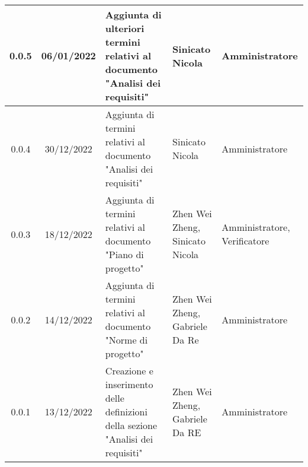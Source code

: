 \begin{center}
\begin{tabularx}{\textwidth}{| c | c | X | X | X |}
 \hline
 0.0.5 & 06/01/2022 & Aggiunta di ulteriori termini relativi al documento "Analisi dei requisiti" & Sinicato Nicola & Amministratore \\
 \hline
 0.0.4 & 30/12/2022 & Aggiunta di termini relativi al documento "Analisi dei requisiti" & Sinicato Nicola & Amministratore \\
 \hline
 0.0.3 & 18/12/2022 & Aggiunta di termini relativi al documento "Piano di progetto" & Zhen Wei Zheng, Sinicato Nicola & Amministratore, Verificatore\\
 \hline
 0.0.2 & 14/12/2022 & Aggiunta di termini relativi al documento "Norme di progetto" & Zhen Wei Zheng, Gabriele Da Re & Amministratore\\
 \hline
 0.0.1 & 13/12/2022 & Creazione e inserimento delle definizioni della sezione "Analisi dei requisiti" & Zhen Wei Zheng, Gabriele Da RE & Amministratore\\
 \hline
\end{tabularx}
\end{center}
